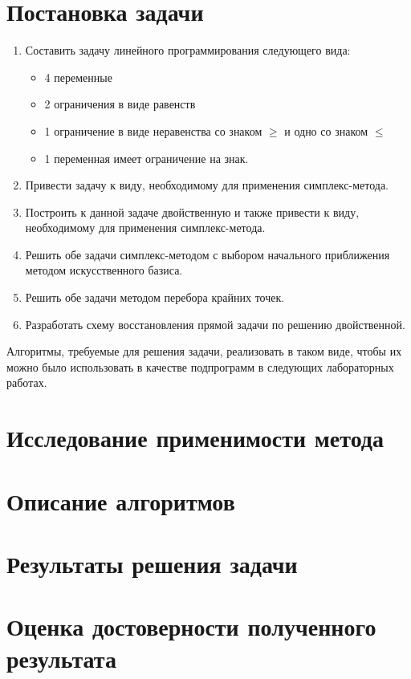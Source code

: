 \documentclass[main.tex]{subfiles}
\begin{document}
\section{Постановка задачи}
\begin{enumerate}
\item Составить задачу линейного программирования следующего вида:
	\begin{itemize}
	\item 4 переменные
	\item 2 ограничения в виде равенств
	\item 1 ограничение в виде неравенства со знаком $\geq$ и одно со знаком $\leq$
	\item 1 переменная имеет ограничение на знак.
	\end{itemize}
\item Привести задачу к виду, необходимому для применения симплекс-метода.
\item Построить к данной задаче двойственную и также привести к виду, необходимому для применения симплекс-метода.
\item Решить обе задачи симплекс-методом с выбором начального приближения методом искусственного базиса.
\item Решить обе задачи методом перебора крайних точек.
\item Разработать схему восстановления прямой задачи по решению двойственной.
\end{enumerate}
Алгоритмы, требуемые для решения задачи, реализовать в таком виде, чтобы их можно было использовать в качестве подпрограмм в следующих лабораторных работах.
\section{Исследование применимости метода}
\section{Описание алгоритмов}
\section{Результаты решения задачи}
\section{Оценка достоверности полученного результата}
\end{document}
